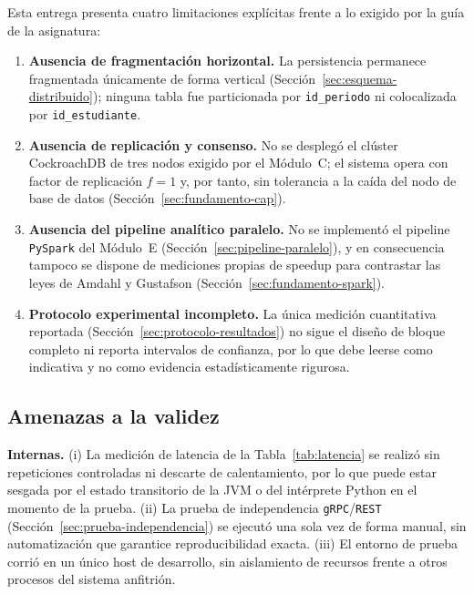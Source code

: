 \documentclass[12pt,a4paper]{article}
\begin{document}
Esta entrega presenta cuatro limitaciones explícitas frente a lo exigido
por la guía de la asignatura:

\begin{enumerate}
  \item \textbf{Ausencia de fragmentación horizontal.} La persistencia
        permanece fragmentada únicamente de forma vertical
        (Sección~\ref{sec:esquema-distribuido}); ninguna tabla fue
        particionada por \texttt{id\_periodo} ni colocalizada por
        \texttt{id\_estudiante}.
  \item \textbf{Ausencia de replicación y consenso.} No se desplegó el
        clúster CockroachDB de tres nodos exigido por el Módulo~C; el
        sistema opera con factor de replicación $f=1$ y, por tanto, sin
        tolerancia a la caída del nodo de base de datos
        (Sección~\ref{sec:fundamento-cap}).
  \item \textbf{Ausencia del pipeline analítico paralelo.} No se
        implementó el pipeline \texttt{PySpark} del Módulo~E
        (Sección~\ref{sec:pipeline-paralelo}), y en consecuencia tampoco
        se dispone de mediciones propias de speedup para contrastar las
        leyes de Amdahl y Gustafson (Sección~\ref{sec:fundamento-spark}).
  \item \textbf{Protocolo experimental incompleto.} La única medición
        cuantitativa reportada (Sección~\ref{sec:protocolo-resultados})
        no sigue el diseño de bloque completo ni reporta intervalos de
        confianza, por lo que debe leerse como indicativa y no como
        evidencia estadísticamente rigurosa.
\end{enumerate}

\subsection{Amenazas a la validez}

\textbf{Internas.} (i) La medición de latencia de la Tabla~\ref{tab:latencia}
se realizó sin repeticiones controladas ni descarte de calentamiento, por
lo que puede estar sesgada por el estado transitorio de la JVM o del
intérprete Python en el momento de la prueba. (ii) La prueba de
independencia \texttt{gRPC}/\texttt{REST} (Sección~\ref{sec:prueba-independencia})
se ejecutó una sola vez de forma manual, sin automatización que garantice
reproducibilidad exacta. (iii) El entorno de prueba corrió en un único
host de desarrollo, sin aislamiento de recursos frente a otros procesos
del sistema anfitrión.
\end{document}

